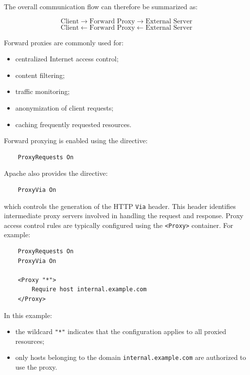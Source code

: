 \documentclass{scrbook}
\begin{document}
	The overall communication flow can therefore be summarized as:
	
	\[
	\text{Client} \rightarrow \text{Forward Proxy} \rightarrow \text{External Server}
	\]
	\[
	\text{Client} \leftarrow \text{Forward Proxy} \leftarrow \text{External Server}
	\]
	
	Forward proxies are commonly used for:
	\begin{itemize}
		\item centralized Internet access control;
		
		\item content filtering;
		
		\item traffic monitoring;
		
		\item anonymization of client requests;
		
		\item caching frequently requested resources.
	\end{itemize}
	
	Forward proxying is enabled using the directive:
	
	\begin{lstlisting}
	ProxyRequests On
	\end{lstlisting}
	
	Apache also provides the directive:
	
	\begin{lstlisting}
	ProxyVia On
	\end{lstlisting}
	
	which controls the generation of the HTTP \texttt{Via} header. This header identifies intermediate proxy servers involved in handling the request and response. Proxy access control rules are typically configured using the \texttt{<Proxy>} container. For example:
	
	\begin{lstlisting}
	ProxyRequests On
	ProxyVia On
	
	<Proxy "*">
		Require host internal.example.com
	</Proxy>
	\end{lstlisting}
	
	In this example:
	\begin{itemize}
		\item the wildcard \texttt{"*"} indicates that the configuration applies to all proxied resources;
		
		\item only hosts belonging to the domain \texttt{internal.example.com} are authorized to use the proxy.
	\end{itemize}
	
\end{document}
